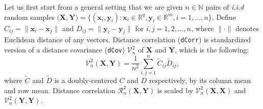 \documentclass[12pt]{article}
\theoremstyle{definition}
\begin{document}
Let us first start from a general setting that we are given $n \in \mathbb{N}$ pairs of \textit{i.i.d} random samples $\big(  \mathbf{X}, \mathbf{Y}  \big)  = \{ (\mathbf{x}_{i}, \mathbf{y}_{i}) : \mathbf{x}_{i} \in \mathbb{R}^{q}, \mathbf{y}_{i} \in \mathbb{R}^{m}, i = 1,...,n \}$. Define $C_{ij} = \parallel \mathbf{x}_{i} - \mathbf{x}_{j} \parallel$ and $D_{ij} = \parallel \mathbf{y}_{i} - \mathbf{y}_{j} \parallel$ for $i,j=1,2, \ldots ,n$, where $\parallel \cdot \parallel$ denotes Euclidean distance of any vectors.   
Distance correlation (\texttt{dCorr}) is standardized version of a distance covariance (\texttt{dCov}) $\mathcal{V}^2_{n}$ of $\mathbf{X}$ and $\mathbf{Y}$, which is the following: 
\begin{equation}	 
\mathcal{V}^2_{n}(\mathbf{X}, \mathbf{Y}) = \frac{1}{n^2} \sum\limits_{i,j=1}^{n} \tilde{C}_{ij} \tilde{D}_{ij},
\end{equation}
where $\tilde{C}$ and $\tilde{D}$ is a doubly-centered $C$ and $D$ respectively, by its column mean and row mean. Distance correlation $\mathcal{R}^{2}_{n}(\mathbf{X}, \mathbf{Y})$ is scaled by $\mathcal{V}^2_{n}(\mathbf{X}, \mathbf{X})$ and $\mathcal{V}^2_{n}(\mathbf{Y}, \mathbf{Y}).$
\end{document}
